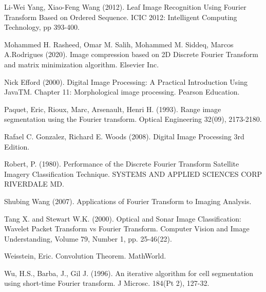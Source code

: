 \begin{thebibliography}{1}
 Li-Wei Yang, Xiao-Feng Wang (2012). Leaf Image Recognition Using Fourier Transform Based on Ordered Sequence. ICIC 2012: Intelligent Computing Technology, pp 393-400.

 Mohammed H. Rasheed, Omar M. Salih, Mohammed M. Siddeq, Marcos A.Rodrigues (2020). Image compression based on 2D Discrete Fourier Transform and matrix minimization algorithm. Elsevier Inc.

 Nick Efford (2000). Digital Image Processing: A Practical Introduction Using JavaTM. Chapter 11: Morphological image processing. Pearson Education.

 Paquet, Eric, Rioux, Marc, Arsenault, Henri H. (1993). Range image segmentation using the Fourier transform. Optical Engineering 32(09), 2173-2180.

 Rafael C. Gonzalez, Richard E. Woods (2008). Digital Image Processing 3rd Edition.

 Robert, P. (1980). Performance of the Discrete Fourier Transform Satellite Imagery Classification Technique. SYSTEMS AND APPLIED SCIENCES CORP RIVERDALE MD.

 Shubing Wang (2007). Applications of Fourier Transform to Imaging Analysis. 

 Tang X. and Stewart W.K. (2000). Optical and Sonar Image Classification: Wavelet Packet Transform vs Fourier Transform. Computer Vision and Image Understanding, Volume 79, Number 1,
pp. 25-46(22).

 Weisstein, Eric. Convolution Theorem. MathWorld.

 Wu, H.S., Barba, J., Gil J. (1996). An iterative algorithm for cell segmentation using short-time Fourier transform. J Microsc. 184(Pt 2), 127-32.

\end{thebibliography}